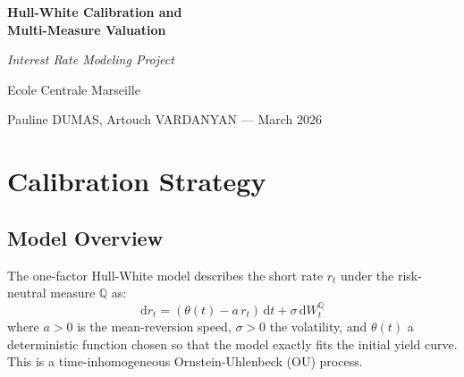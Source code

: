 \documentclass[12pt, a4paper]{article}
\newcommand{\Q}{\mathbb{Q}}
\newcommand{\diff}{\mathrm{d}}
\begin{document}
\begin{titlepage}
\centering
\vspace*{3cm}
{\LARGE\bfseries Hull-White Calibration and\\[0.3em]Multi-Measure Valuation\par}
\vspace{0.8cm}
{\large\itshape Interest Rate Modeling Project\par}
\vspace{3cm}
{\large Ecole Centrale Marseille\par}
\vspace{0.4cm}
{\normalsize Pauline DUMAS, Artouch VARDANYAN --- March 2026\par}
\vspace{3cm}
\begin{abstract}
\noindent
This report presents the calibration and application of the one-factor Hull-White model for pricing a European payer swaption. We estimate the historical parameters $(a, \sigma)$ from \texteuro STR data using two methods (AR(1) regression and exact MLE), fit the initial yield curve via Nelson-Siegel-Svensson (NSS), and price the swaption under three distinct probability measures ($\Q$, $\Q^T$, $\Q^A$) using Monte Carlo simulation. We then implement a recombining trinomial tree following Hull \& White (1993) and compare the results, analyze convergence, and study the sensitivity to the mean-reversion parameter. All methods converge to a consistent swaption price near $0.0990$ per unit notional.
\end{abstract}
\end{titlepage}

\tableofcontents

\section{Calibration Strategy}

\subsection{Model Overview}

The one-factor Hull-White model describes the short rate $r_t$ under the risk-neutral measure $\Q$ as:
\begin{equation}
\diff r_t = (\theta(t) - a\, r_t)\,\diff t + \sigma\, \diff W_t^{\Q}
\end{equation}
where $a > 0$ is the mean-reversion speed, $\sigma > 0$ the volatility, and $\theta(t)$ a deterministic function chosen so that the model exactly fits the initial yield curve. This is a time-inhomogeneous Ornstein-Uhlenbeck (OU) process.
\end{document}
